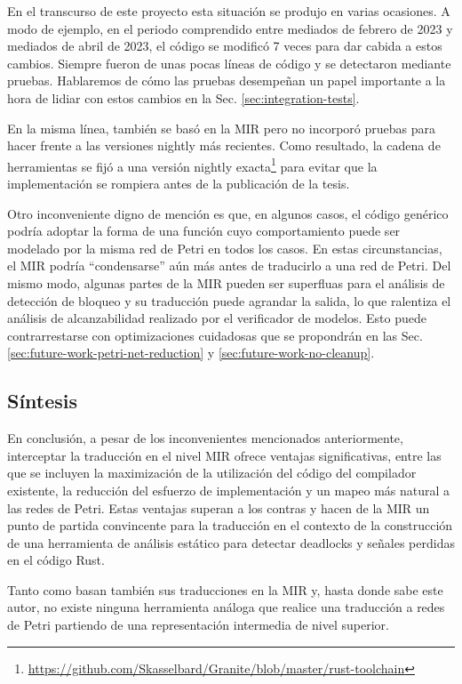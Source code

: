 En el transcurso de este proyecto esta situación se produjo en varias ocasiones. A
modo de ejemplo, en el periodo comprendido entre mediados de febrero de 2023 y mediados
de abril de 2023, el código se modificó 7 veces para dar cabida a estos cambios. Siempre
fueron de unas pocas líneas de código y se detectaron mediante pruebas. Hablaremos de cómo
las pruebas desempeñan un papel importante a la hora de lidiar con estos cambios en la
Sec. \ref{sec:integration-tests}.

En la misma línea, \cite{meyer2020} también se basó en la \acrshort{MIR} pero no incorporó pruebas para
hacer frente a las versiones nightly más recientes. Como resultado, la cadena de herramientas
se fijó a una versión nightly exacta\footnote{\url{https://github.com/Skasselbard/Granite/blob/master/rust-toolchain}}
para evitar que la implementación se rompiera antes de la publicación de la tesis.

Otro inconveniente digno de mención es que, en algunos casos, el código genérico podría
adoptar la forma de una función cuyo comportamiento puede ser modelado por la misma red de
Petri en todos los casos. En estas circunstancias, el \acrshort{MIR} podría ``condensarse'' aún más antes de
traducirlo a una red de Petri. Del mismo modo, algunas partes de la MIR pueden ser superfluas
para el análisis de detección de bloqueo y su traducción puede agrandar la salida, lo que
ralentiza el análisis de alcanzabilidad realizado por el verificador de modelos. Esto puede
contrarrestarse con optimizaciones cuidadosas
que se propondrán en las Sec. \ref{sec:future-work-petri-net-reduction} y \ref{sec:future-work-no-cleanup}.

\subsection{Síntesis}

En conclusión, a pesar de los inconvenientes mencionados anteriormente, interceptar la
traducción en el nivel \acrshort{MIR} ofrece ventajas significativas, entre las que se incluyen la
maximización de la utilización del código del compilador existente, la reducción del esfuerzo
de implementación y un mapeo más natural a las redes de Petri. Estas ventajas superan a los
contras y hacen de la \acrshort{MIR} un punto de partida convincente para la traducción en el contexto
de la construcción de una herramienta de análisis estático para detectar deadlocks y señales
perdidas en el código Rust.

Tanto \cite{meyer2020} como \cite{zhang2022deadlocks} basan también sus traducciones en la \acrshort{MIR} y,
hasta donde sabe este autor, no existe ninguna herramienta análoga que realice una traducción
a redes de Petri partiendo de una representación intermedia de nivel superior.